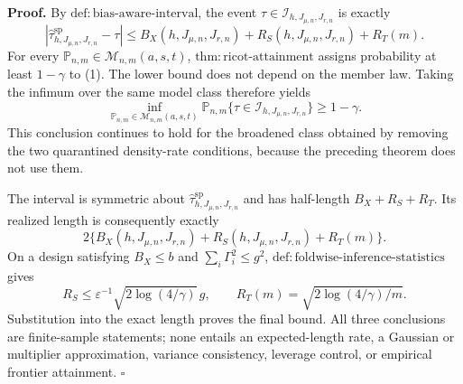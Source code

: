 \textbf{Proof.}
By \(\mathrm{def:bias\text{-}aware\text{-}interval}\), the event \(\tau\in\mathcal I_{h,J_{\mu,n},J_{r,n}}\) is exactly
\[
\left|\widehat\tau^{\mathrm{sp}}_{h,J_{\mu,n},J_{r,n}}-\tau\right|
\le B_X(h,J_{\mu,n},J_{r,n})
+R_S(h,J_{\mu,n},J_{r,n})+R_T(m).
\tag{1}
\]
For every \(\mathbb P_{n,m}\in\mathcal M_{n,m}(a,s,t)\), \(\mathrm{thm:ricot\text{-}attainment}\) assigns probability at least \(1-\gamma\) to (1).  The lower bound does not depend on the member law.  Taking the infimum over the same model class therefore yields
\[
\inf_{\mathbb P_{n,m}\in\mathcal M_{n,m}(a,s,t)}
\mathbb P_{n,m}\{\tau\in\mathcal I_{h,J_{\mu,n},J_{r,n}}\}
\ge1-\gamma.
\]
This conclusion continues to hold for the broadened class obtained by removing the two quarantined density-rate conditions, because the preceding theorem does not use them.

The interval is symmetric about \(\widehat\tau^{\mathrm{sp}}_{h,J_{\mu,n},J_{r,n}}\) and has half-length \(B_X+R_S+R_T\).  Its realized length is consequently exactly
\[
2\{B_X(h,J_{\mu,n},J_{r,n})+R_S(h,J_{\mu,n},J_{r,n})+R_T(m)\}.
\]
On a design satisfying \(B_X\le b\) and \(\sum_i\Gamma_i^2\le g^2\), \(\mathrm{def:foldwise\text{-}inference\text{-}statistics}\) gives
\[
R_S\le\varepsilon^{-1}\sqrt{2\log(4/\gamma)}\,g,
\qquad
R_T(m)=\sqrt{2\log(4/\gamma)/m}.
\]
Substitution into the exact length proves the final bound.  All three conclusions are finite-sample statements; none entails an expected-length rate, a Gaussian or multiplier approximation, variance consistency, leverage control, or empirical frontier attainment. \(\square\)